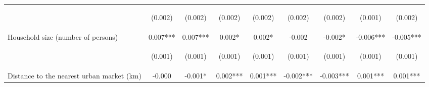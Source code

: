 \begin{center}
\begin{tabular}{lcccccccc}
\vspace{4pt} & \begin{footnotesize}(0.002)\end{footnotesize} & \begin{footnotesize}(0.002)\end{footnotesize} & \begin{footnotesize}(0.002)\end{footnotesize} & \begin{footnotesize}(0.002)\end{footnotesize} & \begin{footnotesize}(0.002)\end{footnotesize} & \begin{footnotesize}(0.002)\end{footnotesize} & \begin{footnotesize}(0.001)\end{footnotesize} & \begin{footnotesize}(0.002)\end{footnotesize} \\
Household size (number of persons) & 0.007*** & 0.007*** & 0.002* & 0.002* & -0.002 & -0.002* & -0.006*** & -0.005*** \\
\vspace{4pt} & \begin{footnotesize}(0.001)\end{footnotesize} & \begin{footnotesize}(0.001)\end{footnotesize} & \begin{footnotesize}(0.001)\end{footnotesize} & \begin{footnotesize}(0.001)\end{footnotesize} & \begin{footnotesize}(0.001)\end{footnotesize} & \begin{footnotesize}(0.001)\end{footnotesize} & \begin{footnotesize}(0.001)\end{footnotesize} & \begin{footnotesize}(0.001)\end{footnotesize} \\
Distance to the nearest urban market (km) & -0.000 & -0.001* & 0.002*** & 0.001*** & -0.002*** & -0.003*** & 0.001*** & 0.001*** \\

\end{tabular}
\end{center}
